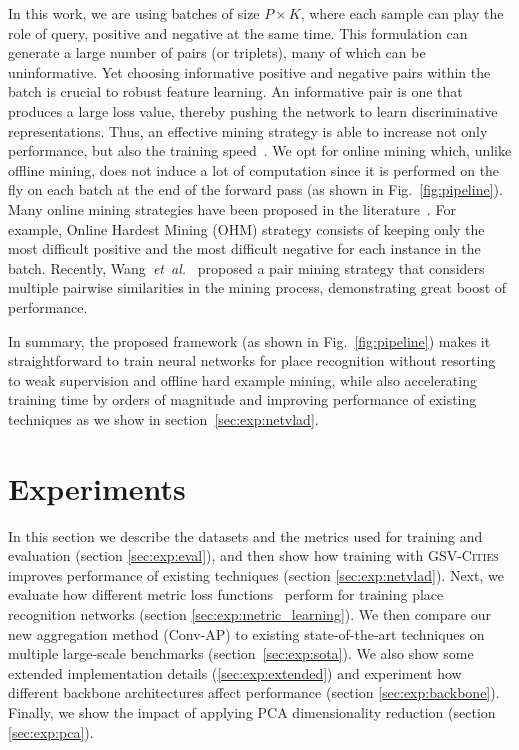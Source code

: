 \documentclass{article}
\newcommand{\etal}{\textit{et~al.}}
\begin{document}
In this work, we are using batches of size $P {\times} K$, where each sample can play the role of query, positive and negative at the same time. This formulation can generate a large number of pairs (or triplets), many of which can be uninformative. Yet choosing informative positive and negative pairs within the batch is crucial to robust feature learning. An informative pair is one that produces a large loss value, thereby pushing the network to learn discriminative representations. Thus, an effective mining strategy is able to increase not only performance, but also the training speed~\cite{kaya2019deep}. We opt for online mining which, unlike offline mining, does not induce a lot of computation since it is performed on the fly on each batch at the end of the forward pass (as shown in Fig.~\ref{fig:pipeline}). Many online mining strategies have been proposed in the literature~\cite{musgrave2020pytorch}. For example, Online Hardest Mining (OHM) strategy \cite{hermans2017defense} consists of keeping only the most difficult positive and the most difficult negative for each instance in the batch. Recently, Wang~\etal~\cite{wang2019multi} proposed a pair mining strategy that considers multiple pairwise similarities in the mining process, demonstrating great boost of performance.

In summary, the proposed framework (as shown in Fig.~\ref{fig:pipeline}) makes it straightforward to train neural networks for place recognition without resorting to weak supervision and offline hard example mining, while also accelerating training time by orders of magnitude and improving performance of existing techniques as we show in section~\ref{sec:exp:netvlad}.






\section{Experiments}
In this section we describe the datasets and the metrics used for training and evaluation (section \ref{sec:exp:eval}), and then show how training with \textsc{GSV-Cities} improves performance of existing techniques (section \ref{sec:exp:netvlad}). Next, we evaluate how different metric loss functions~\cite{musgrave2020pytorch} perform for training place recognition networks (section \ref{sec:exp:metric_learning}). We then compare our new aggregation method (Conv-AP) to existing state-of-the-art techniques on multiple large-scale benchmarks (\mbox{section \ref{sec:exp:sota}}). We also show some extended implementation details (\ref{sec:exp:extended}) and experiment how different backbone architectures affect performance (section \ref{sec:exp:backbone}). Finally, we show the impact of applying PCA dimensionality reduction (section \ref{sec:exp:pca}).
\end{document}
